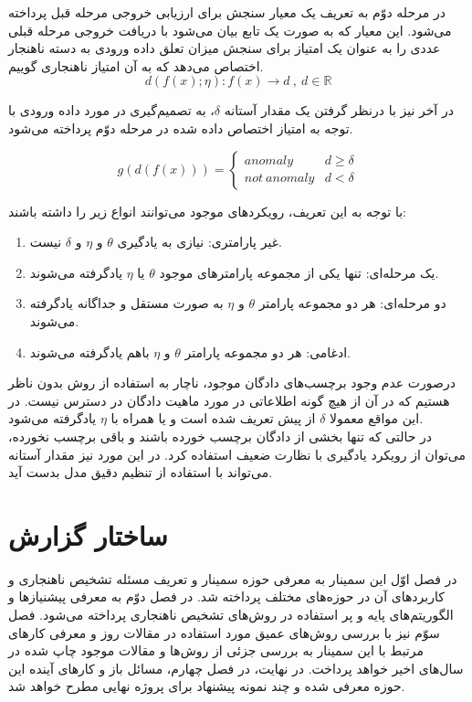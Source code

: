 \documentclass[12pt,a4paper]{report}
\theoremstyle{definition}
\theoremstyle{definition}
\begin{document}
در مرحله دوّم به تعریف یک معیار سنجش برای ارزیابی خروجی مرحله قبل پرداخته می‌شود. این معیار که به صورت یک تابع بیان می‌شود با دریافت خروجی مرحله قبلی عددی را به عنوان یک امتیاز برای سنجش میزان تعلق داده ورودی به دسته ناهنجار اختصاص می‌دهد که به آن امتیاز ناهنجاری گوییم.
\begin{equation}
d(f(x);\eta): f(x) \rightarrow d \  ,\  d \in \mathbb{R}
\end{equation}

در آخر نیز با درنظر گرفتن یک مقدار آستانه $\delta$، به تصمیم‌گیری در مورد داده ورودی با توجه به امتیاز اختصاص داده شده در مرحله دوّم پرداخته می‌شود.

\begin{equation}
g(d(f(x))) = 
\left\{
	\begin{array}{ll}
		anomaly  & d \geq \delta \\
		not\ anomaly & d < \delta
	\end{array}
\right.
\end{equation}

با توجه به این تعریف، رویکرد‌های موجود می‌توانند انواع زیر را داشته باشند:
\begin{enumerate}
	\item {غیر پارامتری: نیازی به یادگیری $\theta$ و $\eta$ و $\delta$ نیست.}
	\item{یک مرحله‌ای: تنها یکی از مجموعه پارامترهای موجود $\theta$ یا  $\eta$ یاد‌گرفته می‌شوند.}
	\item{دو مرحله‌ای:‌ هر دو مجموعه پارامتر $\theta$ و $\eta$ به صورت مستقل و جداگانه یاد‌گرفته می‌شوند.}
	\item{ادغامی: هر دو مجموعه پارامتر $\theta$ و $\eta$ باهم یادگرفته می‌شوند. }
\end{enumerate}

درصورت عدم وجود برچسب‌های دادگان موجود، ناچار به استفاده از روش بدون ناظر هستیم که در آن از هیچ گونه اطلاعاتی در مورد ماهیت دادگان در دسترس نیست. در  این مواقع معمولا $\delta$ از پیش تعریف شده است و یا همراه با  $\eta$ یادگرفته می‌شود.\\
در حالتی که تنها بخشی از دادگان برچسب خورده باشند و باقی برچسب نخورده، می‌توان از رویکرد یادگیری با نظارت ضعیف استفاده کرد. در این مورد نیز مقدار آستانه می‌تواند با استفاده از تنظیم دقیق مدل بدست آید.
\section{ساختار گزارش}
در فصل اوّل این سمینار به معرفی حوزه سمینار و تعریف مسئله تشخیص ناهنجاری و کاربرد‌های آن در حوزه‌های مختلف پرداخته شد. در فصل دوّم به معرفی پیشنیازها و الگوریتم‌های پایه و پر استفاده در روش‌های تشخیص ناهنجاری پرداخته می‌شود. فصل سوّم نیز با بررسی روش‌های عمیق مورد استفاده در مقالات روز و معرفی کار‌های مرتبط با این سمینار به بررسی جزئی از روش‌ها و مقالات موجود چاپ شده در سال‌های اخیر خواهد پرداخت. در نهایت، در فصل چهارم، مسائل باز و کار‌های آینده این حوزه معرفی شده و چند نمونه پیشنهاد برای پروژه نهایی مطرح خواهد شد.
\end{document}
